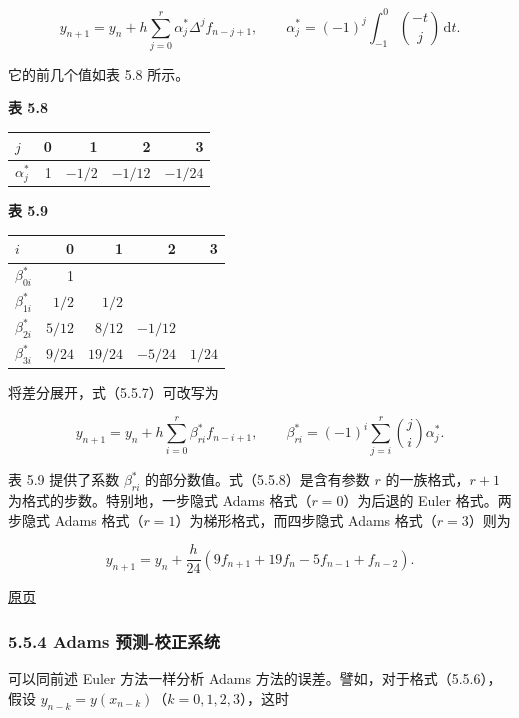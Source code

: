 \documentclass[
  10pt,
  fontset=fandol]{ctexart}
\newcounter{none} %
\begin{document}
\[
y_{n+1}=y_n+h\sum_{j=0}^r\alpha_j^*\Delta^j f_{n-j+1},\qquad
\alpha_j^*=(-1)^j\int_{-1}^0\binom{-t}{j}\,\mathrm dt.
\tag{5.5.7}
\]

它的前几个值如表 5.8 所示。

\textbf{表 5.8}

{\def\LTcaptype{none} %
\begin{longtable}[]{@{}lrrrr@{}}
\toprule\noalign{}
\(j\) & 0 & 1 & 2 & 3 \\
\midrule\noalign{}
\endhead
\bottomrule\noalign{}
\endlastfoot
\(\alpha_j^*\) & 1 & \(-1/2\) & \(-1/12\) & \(-1/24\) \\
\end{longtable}
}

\textbf{表 5.9}

{\def\LTcaptype{none} %
\begin{longtable}[]{@{}lrrrr@{}}
\toprule\noalign{}
\(i\) & 0 & 1 & 2 & 3 \\
\midrule\noalign{}
\endhead
\bottomrule\noalign{}
\endlastfoot
\(\beta_{0i}^*\) & 1 & & & \\
\(\beta_{1i}^*\) & \(1/2\) & \(1/2\) & & \\
\(\beta_{2i}^*\) & \(5/12\) & \(8/12\) & \(-1/12\) & \\
\(\beta_{3i}^*\) & \(9/24\) & \(19/24\) & \(-5/24\) & \(1/24\) \\
\end{longtable}
}

将差分展开，式（5.5.7）可改写为

\[
y_{n+1}=y_n+h\sum_{i=0}^r\beta_{ri}^*f_{n-i+1},\qquad
\beta_{ri}^*=(-1)^i\sum_{j=i}^r\binom ji\alpha_j^*.
\tag{5.5.8}
\]

表 5.9 提供了系数 \(\beta_{ri}^*\) 的部分数值。式（5.5.8）是含有参数 \(r\) 的一族格式，\(r+1\) 为格式的步数。特别地，一步隐式 Adams 格式（\(r=0\)）为后退的 Euler 格式。两步隐式 Adams 格式（\(r=1\)）为梯形格式，而四步隐式 Adams 格式（\(r=3\)）则为

\[
y_{n+1}=y_n+\frac h{24}(9f_{n+1}+19f_n-5f_{n-1}+f_{n-2}).
\tag{5.5.9}
\]

\href{../../source-images/pdf-140.jpeg}{原页}

\subsubsection{5.5.4 Adams 预测-校正系统}\label{adams-ux9884ux6d4b-ux6821ux6b63ux7cfbux7edf}

可以同前述 Euler 方法一样分析 Adams 方法的误差。譬如，对于格式（5.5.6），假设 \(y_{n-k}=y(x_{n-k})\)（\(k=0,1,2,3\)），这时
\end{document}
